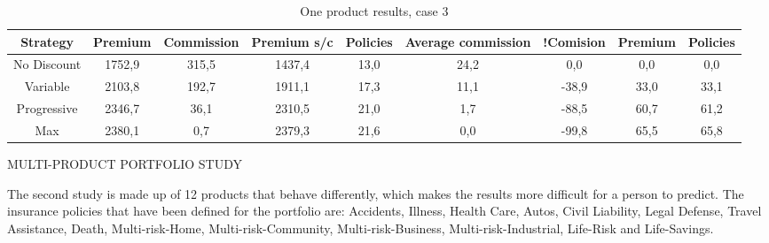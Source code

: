 \documentclass[review]{elsarticle}
\begin{document}
\begin{table}[htb]
\centering
\caption{One product results, case 3}
\label{tab:b5}
\begin{tabular}{c c c c c c c c c}
        \hline
        \hline
        Strategy & Premium & Commission & Premium s/c & Policies & Average commission & !Comision &Premium & Policies \\
        \hline
        No Discount & 1752,9 & 315,5 & 1437,4 & 13,0 & 24,2 &0,0 & 0,0 & 0,0\\
        \hline
        Variable & 2103,8 & 192,7 & 1911,1 & 17,3 & 11,1 & -38,9 & 33,0 & 33,1 \\
        \hline
        Progressive & 2346,7 & 36,1 & 2310,5 & 21,0 & 1,7 & -88,5 & 60,7 & 61,2 \\
        Max & 2380,1 & 0,7 & 2379,3 & 21,6 & 0,0 & -99,8 & 65,5 & 65,8 \\
        \hline
\end{tabular}
\end{table}

MULTI-PRODUCT PORTFOLIO STUDY

The second study is made up of 12 products that behave differently, which makes the results more difficult for a person to predict. The insurance policies that have been defined for the portfolio are: Accidents, Illness, Health Care, Autos, Civil Liability, Legal Defense, Travel Assistance, Death, Multi-risk-Home, Multi-risk-Community, Multi-risk-Business, Multi-risk-Industrial, Life-Risk and Life-Savings.
\end{document}
